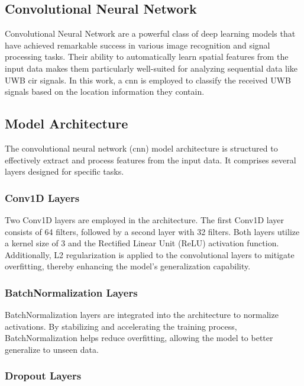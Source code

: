 \subsection{\Gls{Convolutional Neural Network}}\label{cnn}

\Gls{Convolutional Neural Network} are a powerful class of deep learning models that have achieved remarkable success in various image recognition and signal processing tasks. Their ability to automatically learn spatial features from the input data makes them particularly well-suited for analyzing sequential data like UWB \acrshort{cir} signals. In this work, a \acrshort{cnn} is employed to classify the received UWB signals based on the location information they contain.


\subsection{Model Architecture}

The convolutional neural network (\acrshort{cnn}) model architecture is structured to effectively extract and process features from the input data. It comprises several layers designed for specific tasks.

\subsubsection{Conv1D Layers}

Two Conv1D layers are employed in the architecture. The first Conv1D layer consists of 64 filters, followed by a second layer with 32 filters. Both layers utilize a kernel size of 3 and the Rectified Linear Unit (ReLU) activation function. Additionally, L2 regularization is applied to the convolutional layers to mitigate overfitting, thereby enhancing the model's generalization capability.

\subsubsection{BatchNormalization Layers}

BatchNormalization layers are integrated into the architecture to normalize activations. By stabilizing and accelerating the training process, BatchNormalization helps reduce overfitting, allowing the model to better generalize to unseen data.

\subsubsection{Dropout Layers}

